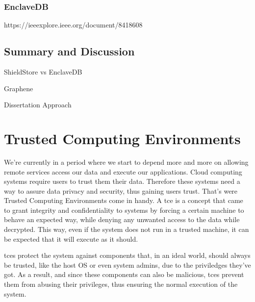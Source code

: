 \subsubsection{EnclaveDB}
https://ieeexplore.ieee.org/document/8418608

\subsection{Summary and Discussion}

ShieldStore vs EnclaveDB

Graphene

Dissertation Approach






\section{Trusted Computing Environments} %
\label{sec:tce}
We're currently in a period where we start to depend more and more on allowing remote services access our data and execute our applications. Cloud computing systems require users to trust them their data. Therefore these systems need a way to assure data privacy and security, thus gaining users trust. That's were Trusted Computing Environments come in handy.
A \gls{tce} is a concept that came to grant integrity and confidentiality to systems by forcing a certain machine to behave an expected way, while denying any unwanted access to the data while decrypted. This way, even if the system does not run in a trusted machine, it can be expected that it will execute as it should. 

\gls{tce}s protect the system against components that, in an ideal world, should always be trusted, like the host OS or even system admins, due to the priviledges they've got. As a result, and since these components can also be malicious, \gls{tce}s prevent them from abusing their privileges, thus ensuring the normal execution of the system. 

